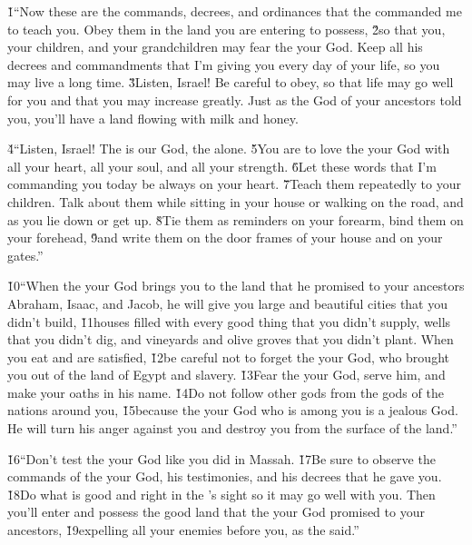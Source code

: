 \v{1}``Now these are the commands, decrees, and ordinances that the  commanded me to teach you. Obey them in the land you are entering to possess, \v{2}so that you, your children, and your grandchildren may fear the  your God. Keep all his decrees and commandments that I'm giving you every day of your life, so you may live a long time. \v{3}Listen, Israel! Be careful to obey, so that life may go well for you and that you may increase greatly. Just as the  God of your ancestors told you, you'll have a land flowing with milk and honey.

\v{4}``Listen, Israel! The  is our God, the  alone. \v{5}You are to love the  your God with all your heart, all your soul, and all your strength. \v{6}Let these words that I'm commanding you today be always on your heart. \v{7}Teach them repeatedly to your children. Talk about them while sitting in your house or walking on the road, and as you lie down or get up. \v{8}Tie them as reminders on your forearm, bind them on your forehead, \v{9}and write them on the door frames of your house and on your gates.''

\v{10}``When the  your God brings you to the land that he promised to your ancestors Abraham, Isaac, and Jacob, he will give you large and beautiful cities that you didn't build, \v{11}houses filled with every good thing that you didn't supply, wells that you didn't dig, and vineyards and olive groves that you didn't plant. When you eat and are satisfied, \v{12}be careful not to forget the  your God, who brought you out of the land of Egypt and slavery. \v{13}Fear the  your God, serve him, and make your oaths in his name. \v{14}Do not follow other gods from the gods of the nations around you, \v{15}because the  your God who is among you is a jealous God. He will turn his anger against you and destroy you from the surface of the land.''

\v{16}``Don't test the  your God like you did in Massah. \v{17}Be sure to observe the commands of the  your God, his testimonies, and his decrees that he gave you. \v{18}Do what is good and right in the 's sight so it may go well with you. Then you'll enter and possess the good land that the  your God promised to your ancestors, \v{19}expelling all your enemies before you, as the  said.''


